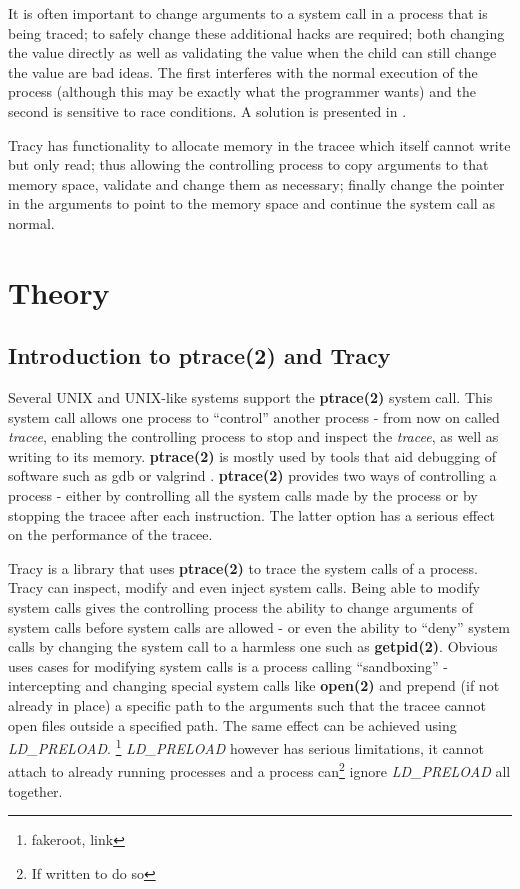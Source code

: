 \documentclass[a4paper, twoside, 10pt, twocolumn]{report}
\begin{document}
It is often important to change arguments to a system call in a process that is
being traced; to safely change these additional hacks are required;
both changing the value directly as well as validating the value when the child
can still change the value are bad ideas.
The first interferes with the normal execution of the process
(although this may be exactly what the programmer wants) and the second is
sensitive to race conditions. A solution is presented in
\cite{Noordende_asecure}.

Tracy has functionality to allocate memory in the
tracee which itself cannot write but only read; thus allowing the controlling
process to copy arguments to that memory space, validate and change them as
necessary; finally change the pointer in the arguments to point to the memory
space and continue the system call as normal.

\chapter{Theory}

\section{Introduction to ptrace(2) and Tracy}

Several UNIX and UNIX-like systems support the \textbf{ptrace(2)} system call.
This system call allows one process to ``control'' another process - from now on
called \textit{tracee}, enabling the controlling process to stop and inspect
the \textit{tracee}, as well as writing to its memory. \textbf{ptrace(2)} is
mostly used by tools that aid debugging of software such as gdb\cite{} or
valgrind \cite{}. \textbf{ptrace(2)} provides two ways of controlling a process
- either by controlling all the system calls made by the process or by stopping
the tracee after each instruction. The latter option has a serious effect on the
performance of the tracee.

Tracy is a library that uses \textbf{ptrace(2)} to trace the system calls of a
process. Tracy can inspect, modify and even inject system calls. Being able to
modify system calls gives the controlling process the ability to change
arguments of system calls before system calls are allowed - or even the ability
to ``deny'' system calls by changing the system call to a harmless one such as
\textbf{getpid(2)}. Obvious uses cases for modifying system calls is a process
calling ``sandboxing'' - intercepting and changing special system calls like
\textbf{open(2)} and prepend (if not already in place) a specific path to the
arguments such that the tracee cannot open files outside a specified path.
The same effect can be achieved using \textit{LD\_PRELOAD}. \footnote{fakeroot,
link} \textit{LD\_PRELOAD} however has serious limitations, it cannot attach to
already running processes and a process can\footnote{If written to do so} ignore
\textit{LD\_PRELOAD} all together.
\end{document}
